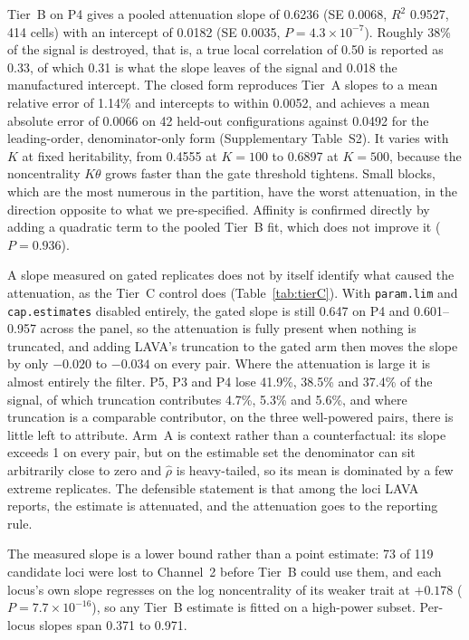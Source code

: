 \documentclass[12pt,a4paper]{article}
\newcommand{\rh}{\hat{\rho}}
\begin{document}
Tier~B on P4 gives a pooled attenuation slope of 0.6236 (SE 0.0068, $R^2$ 0.9527, 414
cells) with an intercept of 0.0182 (SE 0.0035, $P=4.3\times10^{-7}$). Roughly 38\% of the
signal is destroyed, that is, a true local correlation of 0.50 is reported as 0.33, of
which 0.31 is what the slope leaves of the signal and 0.018 the manufactured intercept. The
closed form reproduces Tier~A slopes to a mean relative error of 1.14\% and intercepts to
within 0.0052, and achieves a mean absolute error of 0.0066 on 42 held-out configurations
against 0.0492 for the leading-order, denominator-only form (Supplementary Table~S2). It
varies with $K$ at fixed heritability, from 0.4555 at $K=100$ to 0.6897 at $K=500$,
because the noncentrality $K\theta$ grows faster than the gate threshold tightens. Small
blocks, which are the most numerous in the partition, have the worst attenuation, in the
direction opposite to what we pre-specified. Affinity is confirmed directly by adding a
quadratic term to the pooled Tier~B fit, which does not improve it ($P=0.936$).

A slope measured on gated replicates does not by itself identify what caused the
attenuation, as the Tier~C control does (Table~\ref{tab:tierC}). With \texttt{param.lim} and
\texttt{cap.estimates} disabled entirely, the gated slope is still 0.647 on P4 and
0.601--0.957 across the panel, so the attenuation is fully present when nothing is
truncated, and adding LAVA's truncation to the gated arm then moves the slope by only
$-0.020$ to $-0.034$ on every pair. Where the attenuation is large it is almost entirely
the filter. P5, P3 and P4 lose 41.9\%, 38.5\% and 37.4\% of the signal, of which
truncation contributes 4.7\%, 5.3\% and 5.6\%, and where truncation is a comparable
contributor, on the three well-powered pairs, there is little left to attribute. Arm~A is
context rather than a counterfactual: its slope exceeds 1 on every pair, but on the
estimable set the denominator can sit arbitrarily close to zero and $\rh$ is heavy-tailed,
so its mean is dominated by a few extreme replicates. The defensible statement is that
among the loci LAVA reports, the estimate is attenuated, and the attenuation goes to the
reporting rule.

The measured slope is a lower bound rather than a point estimate: 73 of 119 candidate loci
were lost to Channel~2 before Tier~B could use them, and each locus's own slope regresses
on the log noncentrality of its weaker trait at $+0.178$ ($P=7.7\times10^{-16}$), so any
Tier~B estimate is fitted on a high-power subset. Per-locus slopes span 0.371 to 0.971.
\end{document}
